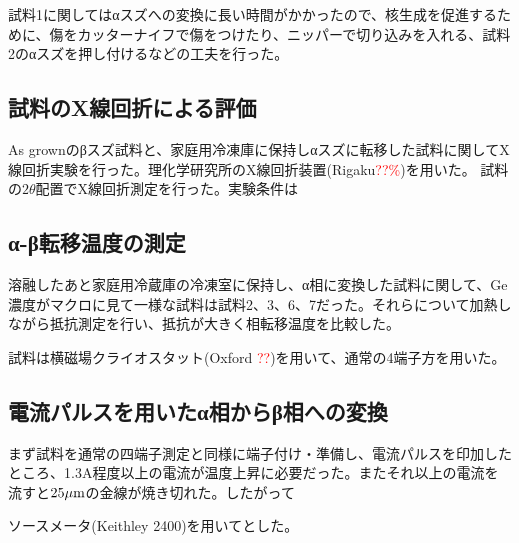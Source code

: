 試料1に関してはαスズへの変換に長い時間がかかったので、核生成を促進するために、傷をカッターナイフで傷をつけたり、ニッパーで切り込みを入れる、試料2のαスズを押し付けるなどの工夫を行った。

\subsection{試料のX線回折による評価}
As grownのβスズ試料と、家庭用冷凍庫に保持しαスズに転移した試料に関してX線回折実験を行った。理化学研究所のX線回折装置(Rigaku\textcolor{red}{??\%})を用いた。
試料の$2\theta$配置でX線回折測定を行った。実験条件は


\subsection{α-β転移温度の測定}
溶融したあと家庭用冷蔵庫の冷凍室に保持し、α相に変換した試料に関して、Ge濃度がマクロに見て一様な試料は試料2、3、6、7だった。それらについて加熱しながら抵抗測定を行い、抵抗が大きく相転移温度を比較した。

試料は横磁場クライオスタット(Oxford \textcolor{red}{??})を用いて、通常の4端子方を用いた。

\subsection{電流パルスを用いたα相からβ相への変換}
まず試料を通常の四端子測定と同様に端子付け・準備し、電流パルスを印加したところ、1.3A程度以上の電流が温度上昇に必要だった。またそれ以上の電流を流すと$25\rm \mu m$の金線が焼き切れた。したがって

ソースメータ(Keithley 2400)を用いてとした。

